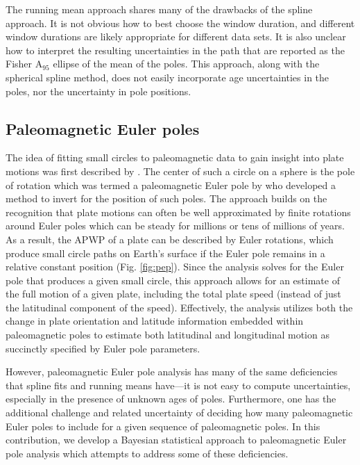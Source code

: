 \documentclass[11pt,letterpaper]{article}
\begin{document}
The running mean approach shares many of the drawbacks of the spline approach.  It is not obvious how to best choose the window duration, and different window durations are likely appropriate for different data sets.  It is also unclear how to interpret the resulting uncertainties in the path that are reported as the Fisher A$_{95}$ ellipse of the mean of the poles. This approach, along with the spherical spline method, does not easily incorporate age uncertainties in the poles, nor the uncertainty in pole positions.

\subsection*{Paleomagnetic Euler poles}
The idea of fitting small circles to paleomagnetic data to gain insight into plate motions was first described by \cite{Francheteau1969a}. The center of such a circle on a sphere is the pole of rotation which was termed a paleomagnetic Euler pole by \cite{Gordon1984a} who developed a method to invert for the position of such poles. The approach builds on the recognition that plate motions can often be well approximated by finite rotations around Euler poles which can be steady for millions or tens of millions of years. As a result, the APWP of a plate can be described by Euler rotations, which produce small circle paths on Earth's surface if the Euler pole remains in a relative constant position (Fig. \ref{fig:pep}). Since the analysis solves for the Euler pole that produces a given small circle, this approach allows for an estimate of the full motion of a given plate, including the total plate speed (instead of just the latitudinal component of the speed). Effectively, the analysis utilizes both the change in plate orientation and latitude information embedded within paleomagnetic poles to estimate both latitudinal and longitudinal motion as succinctly specified by Euler pole parameters.

However, paleomagnetic Euler pole analysis has many of the same deficiencies that spline fits and running means have---it is not easy to compute uncertainties, especially in the presence of unknown ages of poles. Furthermore, one has the additional challenge and related uncertainty of deciding how many paleomagnetic Euler poles to include for a given sequence of paleomagnetic poles. In this contribution, we develop a Bayesian statistical approach to paleomagnetic Euler pole analysis which attempts to address some of these deficiencies.

\end{document}
